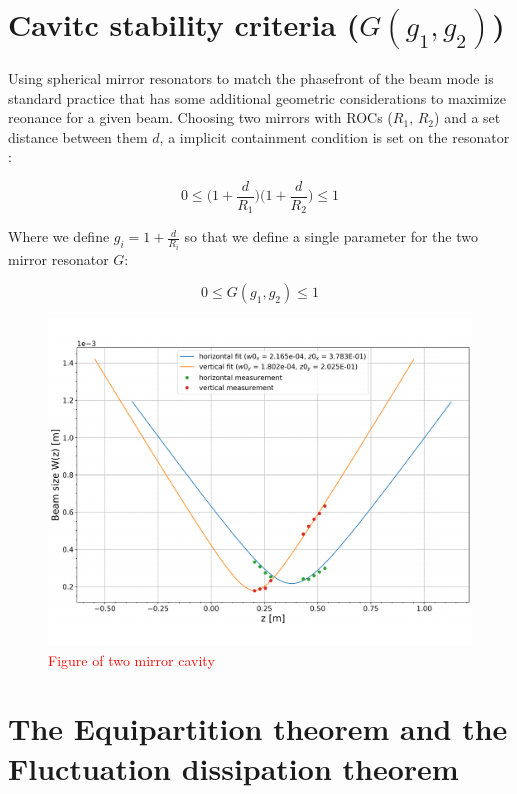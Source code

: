 \section{Cavitc stability criteria ($G(g_1,g_2)$)} \label{sec:cavstab}
Using spherical mirror resonators to match the phasefront of the beam mode is standard practice that has some additional geometric considerations to maximize reonance for a given beam. Choosing two mirrors with ROCs ($R_1$, $R_2$) and a set distance between them $d$, a implicit containment condition is set on the resonator \cite{salehteich:2007}:

$$
	0 \leq \bigg(1 + \frac{d}{R_1} \bigg) \bigg(1 + \frac{d}{R_2} \bigg) \leq 1
$$

Where we define $g_i = 1 + \frac{d}{R_i}$ so that we define a single parameter for the two mirror resonator $G$:

\begin{equation}\label{eq:cavstab}
	0 \leq G(g_1,g_2) \leq 1
\end{equation}

\begin{figure}[H]
\includegraphics[width=\textwidth]{figs/ALGAAS/beam_scans/12_18_2020_preMMT.pdf}
\caption{\textcolor{red}{Figure of two mirror cavity}}
\label{fig:cav_stab}
\end{figure}

\section{The Equipartition theorem and the Fluctuation dissipation theorem}


